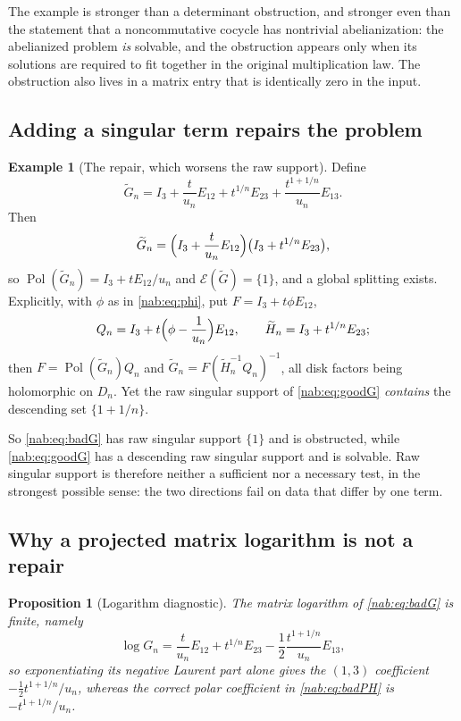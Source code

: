 \documentclass[11pt,letterpaper]{article}
\newtheorem{proposition}[proposition]{Proposition}
\theoremstyle{definition}
\newtheorem{example}[example]{Example}
\theoremstyle{remark}
\newcommand{\Pol}{\operatorname{Pol}}
\newcommand{\EU}{\mathcal E}
\numberwithin{equation}{section}
\begin{document}
The example is stronger than a determinant obstruction, and stronger even than
the statement that a noncommutative cocycle has nontrivial abelianization: the
abelianized problem \emph{is} solvable, and the obstruction appears only when
its solutions are required to fit together in the original multiplication law.
The obstruction also lives in a matrix entry that is identically zero in the
input.

\subsection{Adding a singular term repairs the problem}

\begin{example}[The repair, which worsens the raw support]
\label{nab:ex:repair}
Define
\begin{equation}\label{nab:eq:goodG}
 \widetilde G_n=I_3+\frac{t}{u_n}E_{12}+t^{1/n}E_{23}
  +\frac{t^{1+1/n}}{u_n}E_{13}.
\end{equation}
Then
\[
 \widetilde G_n=\Bigl(I_3+\frac{t}{u_n}E_{12}\Bigr)
                \bigl(I_3+t^{1/n}E_{23}\bigr),
\]
so $\Pol(\widetilde G_n)=I_3+tE_{12}/u_n$ and
$\EU(\widetilde G)=\{1\}$, and a global splitting exists. Explicitly, with
$\phi$ as in \eqref{nab:eq:phi}, put $F=I_3+t\phi E_{12}$,
\[
 Q_n=I_3+t\Bigl(\phi-\frac1{u_n}\Bigr)E_{12},
 \qquad
 \widetilde H_n=I_3+t^{1/n}E_{23};
\]
then $F=\Pol(\widetilde G_n)Q_n$ and
$\widetilde G_n=F(\widetilde H_n^{-1}Q_n)^{-1}$, all disk factors being
holomorphic on $D_n$. Yet the raw singular support of \eqref{nab:eq:goodG}
\emph{contains} the descending set $\{1+1/n\}$.
\end{example}

So \eqref{nab:eq:badG} has raw singular support $\{1\}$ and is obstructed,
while \eqref{nab:eq:goodG} has a descending raw singular support and is
solvable. Raw singular support is therefore neither a sufficient nor a
necessary test, in the strongest possible sense: the two directions fail on
data that differ by one term.

\subsection{Why a projected matrix logarithm is not a repair}

\begin{proposition}[Logarithm diagnostic]\label{nab:prop:logdiag}
The matrix logarithm of \eqref{nab:eq:badG} is finite, namely
\[
 \log G_n=\frac{t}{u_n}E_{12}+t^{1/n}E_{23}
  -\frac12\frac{t^{1+1/n}}{u_n}E_{13},
\]
so exponentiating its negative Laurent part alone gives the $(1,3)$
coefficient $-\tfrac12t^{1+1/n}/u_n$, whereas the correct polar coefficient in
\eqref{nab:eq:badPH} is $-t^{1+1/n}/u_n$.
\end{proposition}
\end{document}
